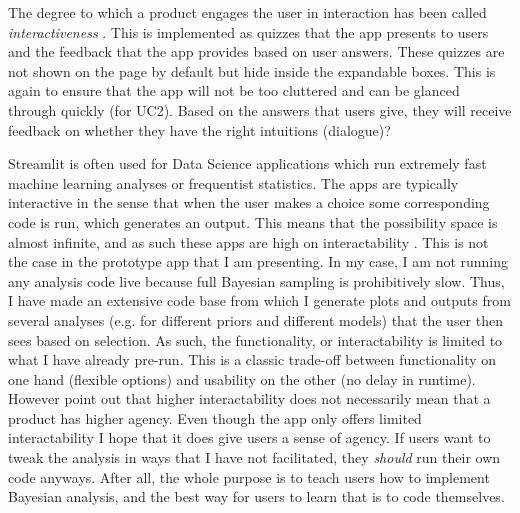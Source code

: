 \documentclass[12pt]{article}
\begin{document}
The degree to which a
product engages the user in interaction has been called \emph{interactiveness}
\autocite{janlert2017meaning}. This is implemented as quizzes that the app
presents to users and the feedback that the app provides based on user answers.
These quizzes are not shown on the page by default but hide inside the expandable boxes.
This is again to ensure that the app will not be too cluttered and can be glanced
through quickly (for UC2). Based on the answers that users give, they will receive
feedback on whether they have the right intuitions (dialogue)?

\vspace{5mm}

Streamlit is often used for Data Science applications which run extremely
fast machine learning analyses or frequentist statistics. The apps are typically
interactive in the sense that when the user makes a choice some corresponding code is run,
which generates an output. This means that the possibility space is almost
infinite, and as such these apps are high on interactability
\autocite{janlert2017meaning}. This is not the case in the prototype app that
I am presenting. In my case, I am not running any analysis code live because full
Bayesian sampling is prohibitively slow. Thus, I have made an extensive code base
from which I generate plots and outputs from several analyses
(e.g. for different priors and different models) that the user then sees based on
selection. As such, the functionality, or interactability is limited to what I
have already pre-run. This is a classic trade-off between functionality on one
hand (flexible options) and usability on the other (no delay in runtime).
However \textcite{janlert2017meaning} point out that higher interactability
does not necessarily mean that a product has higher agency. Even though the
app only offers limited interactability I hope that it does give users a
sense of agency. If users want to tweak the analysis in ways that I have not
facilitated, they \emph{should} run their own code anyways. After all, the whole
purpose is to teach users how to implement Bayesian analysis,
and the best way for users to learn that is to code themselves.
\end{document}
